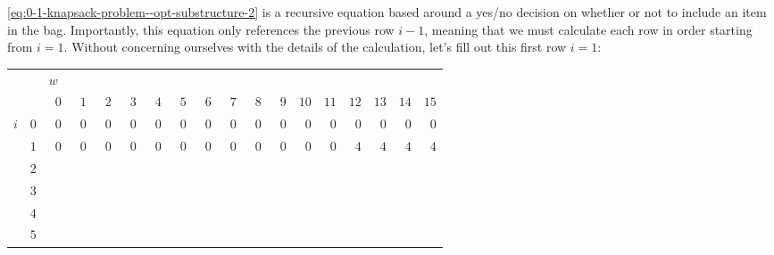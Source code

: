 \eqref{eq:0-1-knapsack-problem--opt-substructure-2} is a recursive equation based around a yes/no decision on whether or not to include an item in the bag. Importantly, this equation only references the previous row $i - 1$, meaning that we must calculate each row in order starting from $i = 1$. Without concerning ourselves with the details of the calculation, let's fill out this first row $i = 1$:
\begin{center}
    \begin{tabular}{cr|rrrrrrrrrrrrrrrr|}
        {}
            &
            & \multicolumn{16}{l|}{$w$} \\
        {}
            &
            & $\phantom{0}0$ & $\phantom{0}1$ & $\phantom{0}2$ & $\phantom{0}3$
            & $\phantom{0}4$ & $\phantom{0}5$ & $\phantom{0}6$ & $\phantom{0}7$
            & $\phantom{0}8$ & $\phantom{0}9$
            & $10$ & $11$ & $12$ &$13$ & $14$ & $15$ \\ \hline
        $i$
            & $0$
            & $0$ & $0$ & $0$ & $0$ & $0$ & $0$ & $0$ & $0$
            & $0$ & $0$ & $0$ & $0$ & $0$ & $0$ & $0$ & $0$ \\
        {}
            & $1$
            & $0$ & $0$ & $0$ & $0$ & $0$ & $0$ & $0$ & $0$
            & $0$ & $0$ & $0$ & $0$ & $4$ & $4$ & $4$ & $4$ \\
        {}
            & $2$
            & & & & & & & & & & & & & & & & \\
        {}
            & $3$
            & & & & & & & & & & & & & & & & \\
        {}
            & $4$
            & & & & & & & & & & & & & & & & \\
        {}
            & $5$
            & & & & & & & & & & & & & & & & \\ \hline
    \end{tabular}
\end{center}
\SkipAfterTable

